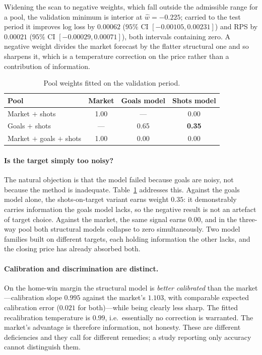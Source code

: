 \documentclass[11pt]{article}
\begin{document}
Widening the scan to negative weights, which fall outside the admissible range
for a pool, the validation minimum is interior at $\hat w = -0.225$; carried to
the test period it improves log loss by $0.00062$ ($95\%$ CI
$[-0.00105, 0.00231]$) and RPS by $0.00021$ ($95\%$ CI $[-0.00029, 0.00071]$),
both intervals containing zero. A negative weight divides the market forecast
by the flatter structural one and so sharpens it, which is a temperature
correction on the price rather than a contribution of information.

\begin{table}[t]
\centering
\caption{Pool weights fitted on the validation period.}
\label{tab:pool}
\small
\begin{tabular}{lccc}
\toprule
Pool & Market & Goals model & Shots model \\
\midrule
Market $+$ shots            & 1.00 & ---  & 0.00 \\
Goals $+$ shots             & ---  & 0.65 & \textbf{0.35} \\
Market $+$ goals $+$ shots  & 1.00 & 0.00 & 0.00 \\
\bottomrule
\end{tabular}
\end{table}

\paragraph{Is the target simply too noisy?} The natural objection is that the
model failed because goals are noisy, not because the method is inadequate.
Table~\ref{tab:pool} addresses this. Against the goals model alone, the
shots-on-target variant earns weight $0.35$: it demonstrably carries information
the goals model lacks, so the negative result is not an artefact of target
choice. Against the market, the same signal earns $0.00$, and in the three-way
pool both structural models collapse to zero simultaneously. Two model families
built on different targets, each holding information the other lacks, and the
closing price has already absorbed both.

\paragraph{Calibration and discrimination are distinct.} On the home-win margin
the structural model is \emph{better calibrated} than the market---calibration
slope $0.995$ against the market's $1.103$, with comparable expected calibration
error ($0.021$ for both)---while being clearly less sharp. The fitted
recalibration temperature is $0.99$, i.e.\ essentially no correction is
warranted. The market's advantage is therefore information, not honesty. These
are different deficiencies and they call for different remedies; a study
reporting only accuracy cannot distinguish them.
\end{document}
